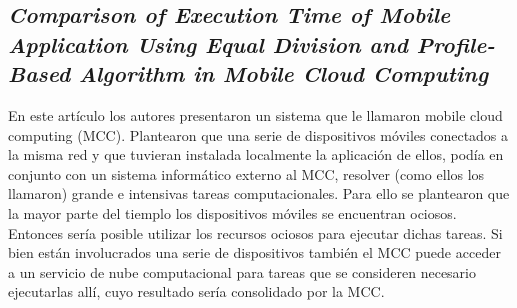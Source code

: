 \subsection{
    \textbf{\emph{Comparison of Execution Time of Mobile
            Application Using Equal Division
            and Profile-Based Algorithm in Mobile
            Cloud Computing}
    }
    \cite[pág. 59]{chaudhary_microservices_2020}
}

En este artículo los autores presentaron un sistema que le llamaron mobile cloud computing (MCC).
Plantearon que una serie de dispositivos móviles conectados a la misma red y que tuvieran instalada localmente la aplicación de ellos, podía en conjunto con un sistema informático externo al MCC, resolver (como ellos los llamaron) grande e intensivas tareas computacionales. Para ello se plantearon que la mayor parte del tiemplo los dispositivos móviles se encuentran ociosos. Entonces sería posible utilizar los recursos ociosos para ejecutar dichas tareas. Si bien están involucrados una serie de dispositivos también el MCC puede acceder a un servicio de nube computacional para tareas que se consideren necesario ejecutarlas allí, cuyo resultado sería consolidado por la MCC.\par


